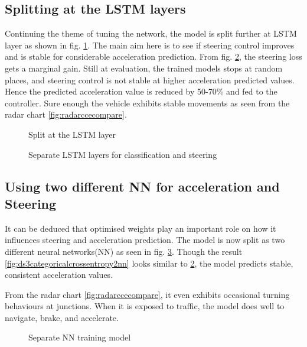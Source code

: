 \subsection{Splitting at the LSTM layers}
Continuing the theme of tuning the network, the model is split further at LSTM layer as shown in fig. \ref{fig:steeringlstmsplit}. The main aim here is to see if steering control improves and
is stable for considerable acceleration prediction. From fig. \ref{fig:ds3categoricalcrossentropylstm}, the steering loss gets a marginal gain. Still at
evaluation, the trained models stops at random places, and steering control is not stable at
higher acceleration predicted values. Hence the predicted acceleration value is reduced by
50-70\% and fed to the controller. Sure enough the vehicle exhibits stable movements as
seen from the radar chart \ref{fig:radarccecompare}.

\begin{figure}[!ht]
	\centering
    \def\svgwidth{0.25\textwidth}
    \caption{Split at the LSTM layer}
    \label{fig:steeringlstmsplit}
\end{figure}

\begin{figure}[!ht]
	\centering
    \def\svgwidth{\textwidth}
    \caption{Separate LSTM layers for classification and steering}
    \label{fig:ds3categoricalcrossentropylstm}
\end{figure}

\subsection{Using two different NN for acceleration and
Steering}
It can be deduced that optimised weights play an important role on how it influences
steering and acceleration prediction. The model is now split as two different neural
networks(NN) as seen in fig. \ref{fig:steeringnnsplit}. Though the result
\ref{fig:ds3categoricalcrossentropy2nn} looks similar to
\ref{fig:ds3categoricalcrossentropylstm}, the model predicts stable, consistent
acceleration values.

From the radar chart \ref{fig:radarccecompare}, it even exhibits occasional turning behaviours at junctions. When it
is exposed to traffic, the model does well to navigate, brake, and accelerate.
\begin{figure}[!ht]
	\centering
    \def\svgwidth{0.25\textwidth}
    \caption{Separate NN training model}
    \label{fig:steeringnnsplit}
\end{figure}

